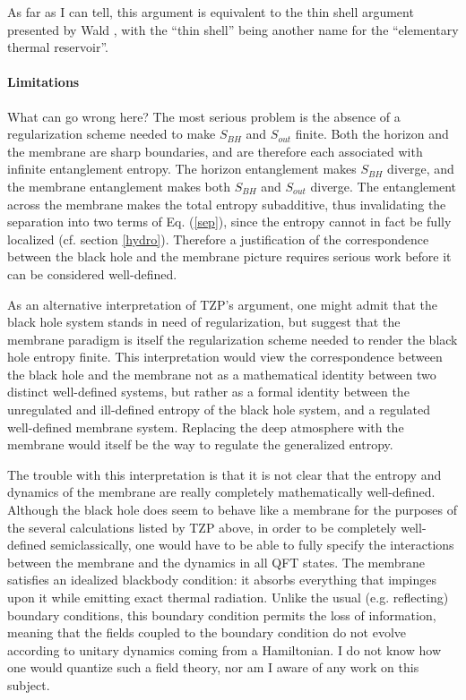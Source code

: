 \documentclass{article}
\begin{document}
As far as I can tell, this argument is equivalent to the thin shell argument presented by Wald \cite{GW01}\cite{wald01}, with the ``thin shell'' being another name for the ``elementary thermal reservoir''.

\paragraph{Limitations}

What can go wrong here?  The most serious problem is the absence of a regularization scheme needed to make $S_{BH}$ and $S_{out}$ finite.  Both the horizon and the membrane are sharp boundaries, and are therefore each associated with infinite entanglement entropy.  The horizon entanglement makes $S_{BH}$ diverge, and the membrane entanglement makes both $S_{BH}$ and $S_{out}$ diverge.  The entanglement across the membrane makes the total entropy subadditive, thus invalidating the separation into two terms of Eq. (\ref{sep}), since the entropy cannot in fact be fully localized (cf. section \ref{hydro}).  Therefore a justification of the correspondence between the black hole and the membrane picture requires serious work before it can be considered well-defined.

As an alternative interpretation of TZP's argument, one might admit that the black hole system stands in need of regularization, but suggest that the membrane paradigm is itself the regularization scheme needed to render the black hole entropy finite.  This interpretation would view the correspondence between the black hole and the membrane not as a mathematical identity between two distinct well-defined systems, but rather as a formal identity between the unregulated and ill-defined entropy of the black hole system, and a regulated well-defined membrane system.  Replacing the deep atmosphere with the membrane would itself be the way to regulate the generalized entropy.

The trouble with this interpretation is that it is not clear that the entropy and dynamics of the membrane are really completely mathematically well-defined.  Although the black hole does seem to behave like a membrane for the purposes of the several calculations listed by TZP above, in order to be completely well-defined semiclassically, one would have to be able to fully specify the interactions between the membrane and the dynamics in all QFT states.  The membrane satisfies an idealized blackbody condition: it absorbs everything that impinges upon it while emitting exact thermal radiation.  Unlike the usual (e.g. reflecting) boundary conditions, this boundary condition permits the loss of information, meaning that the fields coupled to the boundary condition do not evolve according to unitary dynamics coming from a Hamiltonian.  I do not know how one would quantize such a field theory, nor am I aware of any work on this subject.
\end{document}

